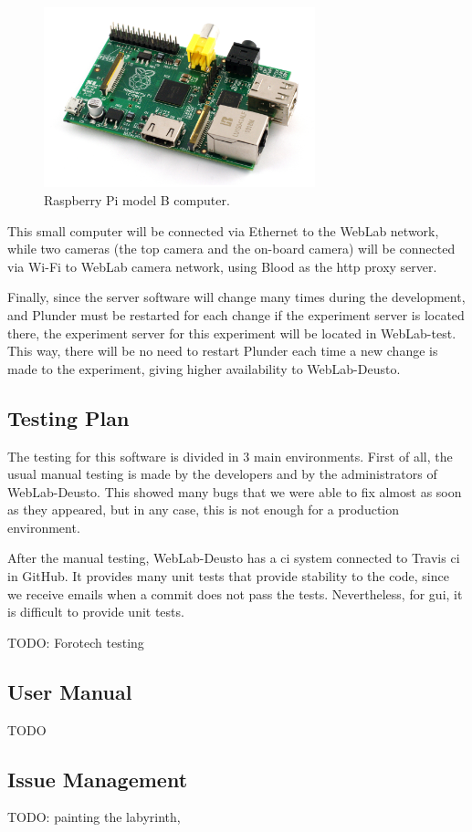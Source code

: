 \begin{figure}[!htbp]
	\centering
	\includegraphics[width=0.7\textwidth]{fig/rasp}
	\caption{Raspberry Pi model B computer.}
	\label{fig:rasp}
\end{figure}

This small computer will be connected via Ethernet to the WebLab network, while two cameras (the top
camera and the on-board camera) will be connected via Wi-Fi to WebLab camera network, using Blood as
the \acrshort{http} proxy server.

Finally, since the server software will change many times during the development, and Plunder must
be restarted for each change if the experiment server is located there, the experiment server for
this experiment will be located in WebLab-test. This way, there will be no need to restart Plunder
each time a new change is made to the experiment, giving higher availability to WebLab-Deusto.

\subsection{Testing Plan}

The testing for this software is divided in 3 main environments. First of all, the usual manual
testing is made by the developers and by the administrators of WebLab-Deusto. This showed many bugs
that we were able to fix almost as soon as they appeared, but in any case, this is not enough
for a production environment.

After the manual testing, WebLab-Deusto has a \acrlong{ci} system connected to Travis \acrshort{ci}
in GitHub. It provides many unit tests that provide stability to the code, since we receive emails
when a commit does not pass the tests. Nevertheless, for \acrshort{gui}, it is difficult to provide
unit tests.

TODO: Forotech testing

\subsection{User Manual}

TODO

\subsection{Issue Management}

TODO: painting the labyrinth,
